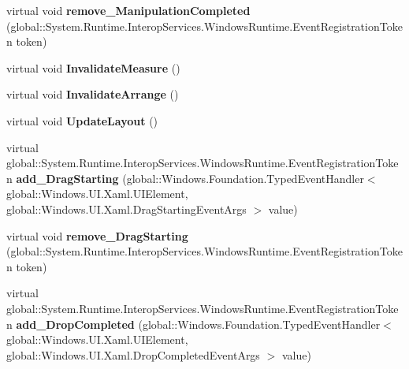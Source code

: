 \begin{DoxyCompactItemize}
\item 
\mbox{\label{class_windows_1_1_u_i_1_1_xaml_1_1_u_i_element_a7c48548622512fe1236390a569a15e25}} 
virtual void {\bfseries remove\+\_\+\+Manipulation\+Completed} (global\+::\+System.\+Runtime.\+Interop\+Services.\+Windows\+Runtime.\+Event\+Registration\+Token token)
\item 
\mbox{\label{class_windows_1_1_u_i_1_1_xaml_1_1_u_i_element_af682a477dc1f76b91d264ebf62e93325}} 
virtual void {\bfseries Invalidate\+Measure} ()
\item 
\mbox{\label{class_windows_1_1_u_i_1_1_xaml_1_1_u_i_element_a7d39da17eef05f2abf010551fe537ef7}} 
virtual void {\bfseries Invalidate\+Arrange} ()
\item 
\mbox{\label{class_windows_1_1_u_i_1_1_xaml_1_1_u_i_element_a6b5438d6f477c2ec1851d0ab5cc2d36c}} 
virtual void {\bfseries Update\+Layout} ()
\item 
\mbox{\label{class_windows_1_1_u_i_1_1_xaml_1_1_u_i_element_aef35e032bc4020dd68c6b12a4b83d69c}} 
virtual global\+::\+System.\+Runtime.\+Interop\+Services.\+Windows\+Runtime.\+Event\+Registration\+Token {\bfseries add\+\_\+\+Drag\+Starting} (global\+::\+Windows.\+Foundation.\+Typed\+Event\+Handler$<$ global\+::\+Windows.\+U\+I.\+Xaml.\+U\+I\+Element, global\+::\+Windows.\+U\+I.\+Xaml.\+Drag\+Starting\+Event\+Args $>$ value)
\item 
\mbox{\label{class_windows_1_1_u_i_1_1_xaml_1_1_u_i_element_ae2df4eabbc6b1dbc7a5a85a0866f4fba}} 
virtual void {\bfseries remove\+\_\+\+Drag\+Starting} (global\+::\+System.\+Runtime.\+Interop\+Services.\+Windows\+Runtime.\+Event\+Registration\+Token token)
\item 
\mbox{\label{class_windows_1_1_u_i_1_1_xaml_1_1_u_i_element_a55d6a19a803c9584cc9a54e02eb240aa}} 
virtual global\+::\+System.\+Runtime.\+Interop\+Services.\+Windows\+Runtime.\+Event\+Registration\+Token {\bfseries add\+\_\+\+Drop\+Completed} (global\+::\+Windows.\+Foundation.\+Typed\+Event\+Handler$<$ global\+::\+Windows.\+U\+I.\+Xaml.\+U\+I\+Element, global\+::\+Windows.\+U\+I.\+Xaml.\+Drop\+Completed\+Event\+Args $>$ value)

\end{DoxyCompactItemize}
